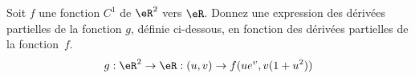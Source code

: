 
\begin{exercice}\label{exo0053}


Soit $f$ une fonction $C^1$ de $\eR^2$ vers $\eR$. Donnez une expression des dérivées partielles de la fonction $g$, définie ci-dessous, en fonction des dérivées partielles de la fonction~$f$.
\[
g: \eR^2 \rightarrow \eR:(u,v) \rightarrow f(ue^v,v(1+u^2))
\]

\end{exercice}

